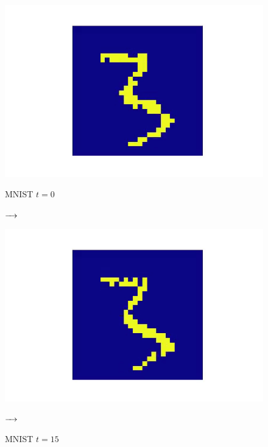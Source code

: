 \documentclass[11pt]{article}
\begin{document}
\begin{figure}[H]
  \centering
  \begin{minipage}{0.3\textwidth}
    \centering
    \includegraphics[width=1\textwidth]{image/rate_gif-0.png}
    \caption{MNIST\cite{eshraghian2021training} $t=0$}
    \label{fig:rate_t_0}
  \end{minipage}
  \hfill
  $\xrightarrow{\hspace*{0.3cm}}$
  \hfill
  \begin{minipage}{0.3\textwidth}
    \centering
    \includegraphics[width=1\textwidth]{image/rate_gif-15.png}
    \caption{MNIST\cite{eshraghian2021training} $t=15$}
    \label{fig:rate_t_15}
  \end{minipage}
  \hfill
  $\xrightarrow{\hspace*{0.3cm}}$
  \hfill
  \begin{minipage}{0.3\textwidth}
    \centering

\end{minipage}
\end{figure}
\end{document}
